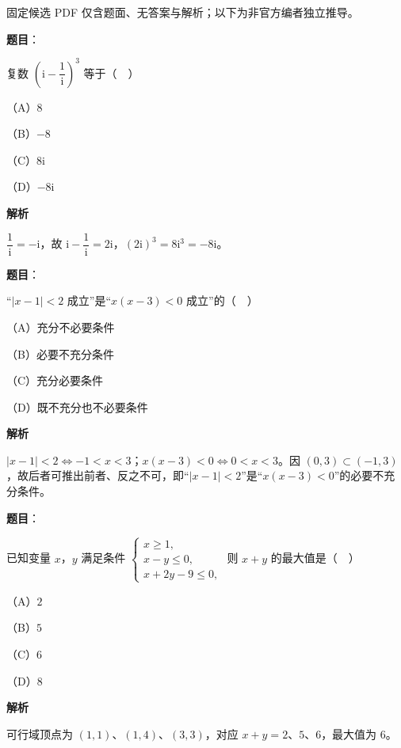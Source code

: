 

\begin{gktip}
固定候选 PDF 仅含题面、无答案与解析；以下为非官方编者独立推导。
\end{gktip}

\begin{answer}

\textbf{题目}：

复数 $\left(\mathrm i-\dfrac1{\mathrm i}\right)^3$ 等于（　）

（A）$8$

（B）$-8$

（C）$8\mathrm i$

（D）$-8\mathrm i$

\textbf{解析}

$\dfrac1{\mathrm i}=-\mathrm i$，故 $\mathrm i-\dfrac1{\mathrm i}=2\mathrm i$，$(2\mathrm i)^3=8\mathrm i^3=-8\mathrm i$。


\end{answer}
\begin{answer}

\textbf{题目}：

“$|x-1|<2$ 成立”是“$x(x-3)<0$ 成立”的（　）

（A）充分不必要条件

（B）必要不充分条件

（C）充分必要条件

（D）既不充分也不必要条件

\textbf{解析}

$|x-1|<2\iff-1<x<3$；$x(x-3)<0\iff0<x<3$。因 $(0,3)\subset(-1,3)$，故后者可推出前者、反之不可，即“$|x-1|<2$”是“$x(x-3)<0$”的必要不充分条件。


\end{answer}
\begin{answer}

\textbf{题目}：

已知变量 $x$，$y$ 满足条件 $\begin{cases}x\geqslant1,\\ x-y\leqslant0,\\ x+2y-9\leqslant0,\end{cases}$ 则 $x+y$ 的最大值是（　）

（A）$2$

（B）$5$

（C）$6$

（D）$8$

\textbf{解析}

可行域顶点为 $(1,1)$、$(1,4)$、$(3,3)$，对应 $x+y=2$、$5$、$6$，最大值为 $6$。


\end{answer}
